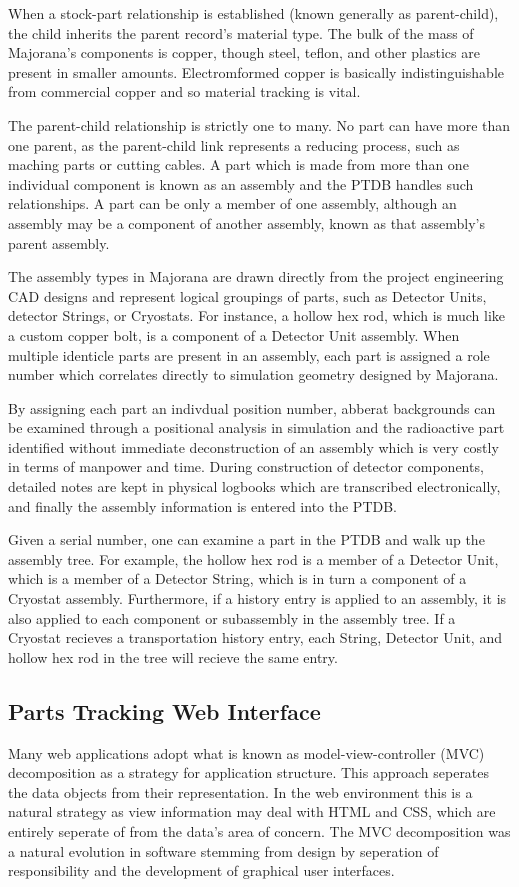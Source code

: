 \documentclass[journal]{IEEEtran}
\begin{document}
When a stock-part relationship is established (known generally as parent-child), the child inherits the parent record's
material type. The bulk of the mass of Majorana's components is copper, though steel, teflon, and other plastics are 
present in smaller amounts. Electromformed copper is basically indistinguishable from commercial copper and so material
tracking is vital.

The parent-child relationship is strictly one to many. No part can have more than one parent, as the parent-child link
represents a reducing process, such as maching parts or cutting cables. A part which is made from more than one individual
component is known as an assembly and the PTDB handles such relationships. A part can be only a member of one assembly,
although an assembly may be a component of another assembly, known as that assembly's parent assembly.

The assembly types in Majorana are drawn directly from the project engineering CAD designs and represent logical 
groupings of parts, such as Detector Units, detector Strings, or Cryostats. For instance, a hollow hex rod, which is much like
a custom copper bolt, is a component of a Detector Unit assembly. When multiple identicle parts are present in an assembly,
each part is assigned a role number which correlates directly to simulation geometry designed by Majorana. 

By assigning each part an indivdual position number, abberat backgrounds can be examined through a positional analysis in 
simulation and the radioactive part identified without immediate deconstruction of an assembly which is very costly in 
terms of manpower and time. During construction of detector components, detailed notes are kept in physical logbooks which
are transcribed electronically, and finally the assembly information is entered into the PTDB.

Given a serial number, one can examine a part in the PTDB and walk up the assembly tree. For example, the hollow hex rod is a member
of a Detector Unit, which is a member of a Detector String, which is in turn a component of a Cryostat assembly. Furthermore,
if a history entry is applied to an assembly, it is also applied to each component or sub\-assembly in the assembly tree. If a Cryostat recieves
a transportation history entry, each String, Detector Unit, and hollow hex rod in the tree will recieve the same entry.

\subsection{Parts Tracking Web Interface}
Many web applications adopt what is known as model-view-controller (MVC) decomposition
as a strategy for application structure. This approach seperates the data objects from
their representation. In the web environment this is a natural strategy as view information
may deal with HTML and CSS, which are entirely seperate of from the data's area of concern.
The MVC decomposition was a natural evolution in software stemming from design by
seperation of responsibility and the development of graphical user interfaces.
\end{document}
